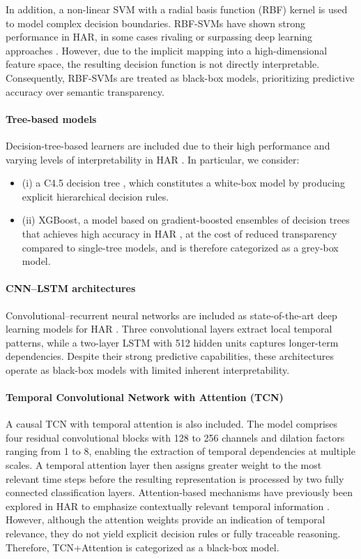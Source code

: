 \documentclass[preprint,12pt]{elsarticle}
\begin{document}
In addition, a non-linear SVM with a radial basis function (RBF) kernel is used to model complex decision boundaries. RBF-SVMs have shown strong performance in HAR, in some cases rivaling or surpassing deep learning approaches \cite{azimzadeh2025human,jobanputra2019human}. However, due to the implicit mapping into a high-dimensional feature space, the resulting decision function is not directly interpretable. Consequently, RBF-SVMs are treated as black-box models, prioritizing predictive accuracy over semantic transparency.

\paragraph{Tree-based models}
Decision-tree-based learners are included due to their high performance and varying levels of interpretability in HAR \cite{jobanputra2019human}. In particular, we consider:
\begin{itemize}
    \item (i) a C4.5 decision tree \cite{sanchez2018decision}, which constitutes a white-box model by producing explicit hierarchical decision rules.
    \item (ii) XGBoost, a model based on gradient-boosted ensembles of decision trees that achieves high accuracy in HAR \cite{zhang2019comprehensive, o2019comparison}, at the cost of reduced transparency compared to single-tree models, and is therefore categorized as a grey-box model.
\end{itemize}

\paragraph{CNN--LSTM architectures}
Convolutional--recurrent neural networks are included as state-of-the-art deep learning models for HAR \cite{ordonez2016deep}. Three convolutional layers extract local temporal patterns, while a two-layer LSTM with 512 hidden units captures longer-term dependencies. Despite their strong predictive capabilities, these architectures operate as black-box models with limited inherent interpretability.

\paragraph{Temporal Convolutional Network with Attention (TCN)}
A causal TCN with temporal attention is also included. The model comprises four residual convolutional blocks with 128 to 256 channels and dilation factors ranging from 1 to 8, enabling the extraction of temporal dependencies at multiple scales. A temporal attention layer then assigns greater weight to the most relevant time steps before the resulting representation is processed by two fully connected classification layers. Attention-based mechanisms have previously been explored in HAR to emphasize contextually relevant temporal information \cite{xu2022shallow}. However, although the attention weights provide an indication of temporal relevance, they do not yield explicit decision rules or fully traceable reasoning. Therefore, TCN+Attention is categorized as a black-box model.
\end{document}
